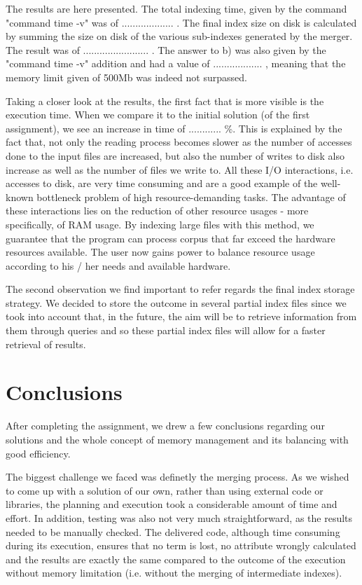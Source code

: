 \documentclass[12pt]{article}
\begin{document}
The results are here presented. The total indexing time, given by the command
"command time -v" was of ................... . 
The final index size on disk is calculated by summing the size on disk of the 
various sub-indexes generated by the merger. 
The result was of ........................ .
The answer to b) was also given by the "command time -v" addition and had a 
value of .................. , meaning that the memory limit given of 500Mb was 
indeed not surpassed.

Taking a closer look at the results, the first fact that is more visible is the
execution time.
When we compare it to the initial solution (of the first assignment), we see an
increase in time of ............ \%.
This is explained by the fact that, not only the reading process becomes slower
as the number of accesses done to the input files are increased, but also the 
number of writes to disk also increase as well as the number of files we write to.
All these I/O interactions, i.e. accesses to disk, are very time consuming and 
are a good example of the well-known bottleneck problem of high resource-demanding tasks.
The advantage of these interactions lies on the reduction of other resource usages - 
more specifically, of RAM usage. 
By indexing large files with this method, we guarantee that the program can process
corpus that far exceed the hardware resources available.
The user now gains power to balance resource usage according to his / her needs and
available hardware.

The second observation we find important to refer regards the final index storage 
strategy. We decided to store the outcome in several partial index files since we
took into account that, in the future, the aim will be to retrieve information from
them through queries and so these partial index files will allow for a faster retrieval
of results.

\newpage
\section*{Conclusions}

After completing the assignment, we drew a few conclusions regarding our
solutions and the whole concept of memory management and its balancing with
good efficiency.

The biggest challenge we faced was definetly the merging process.
As we wished to come up with a solution of our own, rather than using external code or 
libraries, the planning and execution took a considerable amount of time and effort.
In addition, testing was also not very much straightforward, as the results needed to
be manually checked.
The delivered code, although time consuming during its execution, ensures that no term
is lost, no attribute wrongly calculated and the results are exactly the same compared
to the outcome of the execution without memory limitation (i.e. without the merging of
intermediate indexes).
\end{document}
